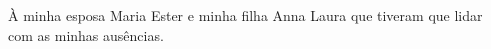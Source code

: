 

\begin{dedicatoria}
À minha esposa Maria Ester e minha filha Anna Laura que tiveram que lidar com as minhas ausências.
\end{dedicatoria}





